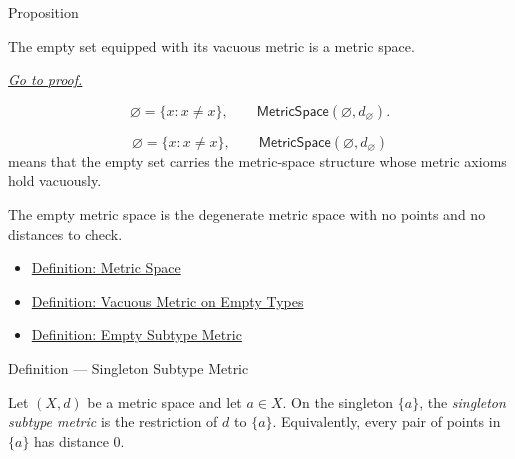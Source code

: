 
\DefinitionalRoot

\begin{propositionbox}{Proposition}
\begin{proposition}
\label{prop:empty-set-metric-space}
The empty set equipped with its vacuous metric is a metric space.

\smallskip
\noindent
\hyperref[prf:empty-set-metric-space]{\textit{Go to proof.}}
\end{proposition}
\end{propositionbox}

\begin{remark*}
\[
  \varnothing=\{x:x\neq x\},
  \qquad
  \mathsf{MetricSpace}(\varnothing,d_{\varnothing}).
\]
\end{remark*}

\begin{remark*}
\[
\varnothing=\{x:x\neq x\},
\qquad
\mathsf{MetricSpace}(\varnothing,d_{\varnothing})
\]
means that the empty set carries the metric-space structure whose metric
axioms hold vacuously.
\end{remark*}

\begin{remark*}[Interpretation]
The empty metric space is the degenerate metric space with no points and no
distances to check.
\end{remark*}


\begin{dependencies}
\begin{itemize}
  \item \hyperref[def:metric-space]{Definition: Metric Space}
  \item \hyperref[def:vacuous-metric-empty-types]{Definition: Vacuous Metric on Empty Types}
  \item \hyperref[def:empty-subtype-metric]{Definition: Empty Subtype Metric}
\end{itemize}
\end{dependencies}

\begin{definitionbox}{Definition --- Singleton Subtype Metric}
\begin{definition}\label{def:singleton-subtype-metric}
Let \((X,d)\) be a metric space and let \(a\in X\).  On the singleton
\(\{a\}\), the \emph{singleton subtype metric} is the restriction of \(d\) to
\(\{a\}\).  Equivalently, every pair of points in \(\{a\}\) has distance
\(0\).
\end{definition}
\end{definitionbox}

